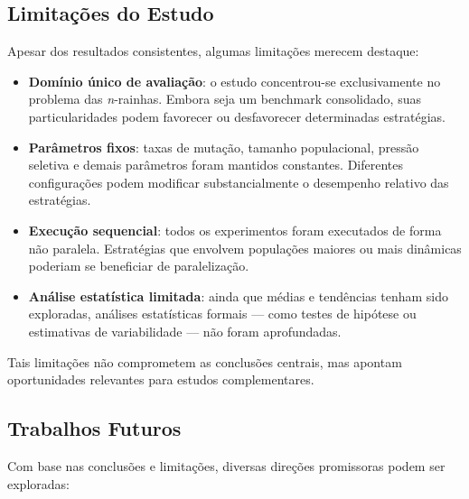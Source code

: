 \subsection{Limitações do Estudo}

Apesar dos resultados consistentes, algumas limitações merecem destaque:

\begin{itemize}
\item \textbf{Domínio único de avaliação}: o estudo concentrou-se exclusivamente no problema das \textit{n}-rainhas. Embora seja um benchmark consolidado, suas particularidades podem favorecer ou desfavorecer determinadas estratégias.
\item \textbf{Parâmetros fixos}: taxas de mutação, tamanho populacional, pressão seletiva e demais parâmetros foram mantidos constantes. Diferentes configurações podem modificar substancialmente o desempenho relativo das estratégias.

\item \textbf{Execução sequencial}: todos os experimentos foram executados de forma não paralela. Estratégias que envolvem populações maiores ou mais dinâmicas poderiam se beneficiar de paralelização.

\item \textbf{Análise estatística limitada}: ainda que médias e tendências tenham sido exploradas, análises estatísticas formais — como testes de hipótese ou estimativas de variabilidade — não foram aprofundadas.

\end{itemize}

Tais limitações não comprometem as conclusões centrais, mas apontam oportunidades relevantes para estudos complementares.

\subsection{Trabalhos Futuros}

Com base nas conclusões e limitações, diversas direções promissoras podem ser exploradas:

